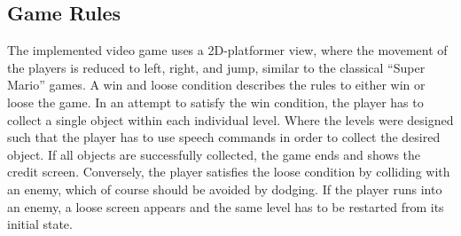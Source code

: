 
\subsection{Game Rules}\label{sec:game_design_rules}
The implemented video game uses a 2D-platformer view, where the movement of the players is reduced to left, right, and jump, similar to the classical \enquote{Super Mario} games.
A win and loose condition describes the rules to either win or loose the game.
In an attempt to satisfy the win condition, the player has to collect a single object within each individual level.
Where the levels were designed such that the player has to use speech commands in order to collect the desired object.
If all objects are successfully collected, the game ends and shows the credit screen.
Conversely, the player satisfies the loose condition by colliding with an enemy, which of course should be avoided by dodging.
If the player runs into an enemy, a loose screen appears and the same level has to be restarted from its initial state.



